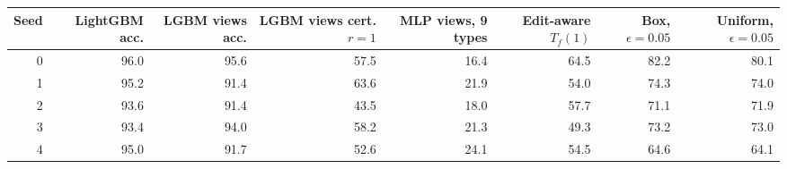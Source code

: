 \begin{tabular}{rrrrrrrr}
\toprule
Seed & LightGBM acc. & LGBM views acc. & LGBM views cert. $r=1$ & MLP views, 9 types & Edit-aware $T_f(1)$ & Box, $\epsilon=0.05$ & Uniform, $\epsilon=0.05$ \\
\midrule
0 & 96.0 & 95.6 & 57.5 & 16.4 & 64.5 & 82.2 & 80.1 \\
1 & 95.2 & 91.4 & 63.6 & 21.9 & 54.0 & 74.3 & 74.0 \\
2 & 93.6 & 91.4 & 43.5 & 18.0 & 57.7 & 71.1 & 71.9 \\
3 & 93.4 & 94.0 & 58.2 & 21.3 & 49.3 & 73.2 & 73.0 \\
4 & 95.0 & 91.7 & 52.6 & 24.1 & 54.5 & 64.6 & 64.1 \\
\bottomrule
\end{tabular}
